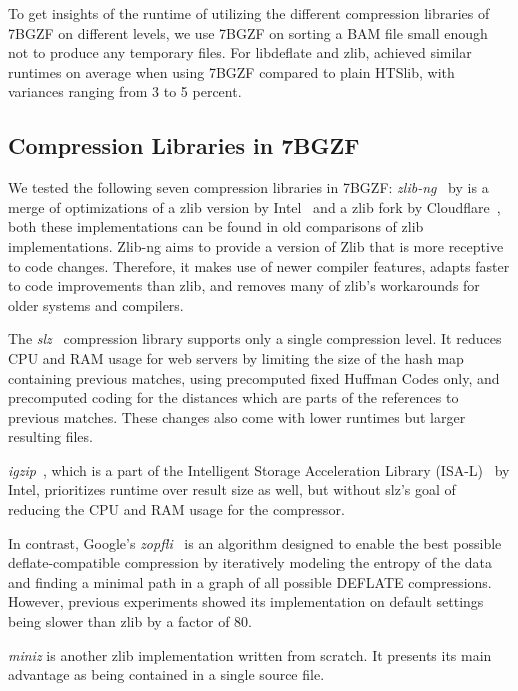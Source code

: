 To get insights of the runtime of \sort utilizing the different compression libraries of 7BGZF on different levels, we use 7BGZF on sorting a BAM file small enough not to produce any temporary files. For libdeflate and zlib, \sort achieved similar runtimes on average when using 7BGZF compared to plain HTSlib, with variances ranging from 3 to 5 percent. 

\subsection{Compression Libraries in 7BGZF}

We tested the following seven compression libraries in 7BGZF:
\textit{zlib-ng}~\cite{noauthor_zlib-ngzlib-ng_2024} by is a merge of optimizations of a zlib version by Intel~\cite{noauthor_intelzlib_2024} and a zlib fork by Cloudflare~\cite{noauthor_cloudflarezlib_2024}, both these implementations can be found in old comparisons of zlib implementations. Zlib-ng aims to provide a version of Zlib that is more receptive to code changes. Therefore, it makes use of newer compiler features, adapts faster to code improvements than zlib, and removes many of zlib's workarounds for older systems and compilers. 

The \textit{slz}~\cite{tarreau_wtarreaulibslz_2024} compression library supports only a single compression level. It reduces CPU and RAM usage for web servers by limiting the size of the hash map containing previous matches, using precomputed fixed Huffman Codes only, and precomputed coding for the distances which are parts of the references to previous matches. These changes also come with lower runtimes but larger resulting files. 

\textit{igzip}~\cite{tucker_isa-l_2017}, which is a part of the Intelligent Storage Acceleration Library (ISA-L)~\cite{noauthor_intelisa-l_2024} by Intel, prioritizes runtime over result size as well, but without slz's goal of reducing the CPU and RAM usage for the compressor. 

In contrast, Google's \textit{zopfli}~\cite{noauthor_googlezopfli_2024} is an algorithm designed to enable the best possible deflate-compatible compression by iteratively modeling the entropy of the data and finding a minimal path in a graph of all possible DEFLATE compressions. However, previous experiments showed its implementation on default settings being slower than zlib by a factor of 80. 

\textit{miniz} \cite{noauthor_richgel999miniz_nodate}  is another zlib implementation written from scratch. It presents its main advantage as being contained in a single source file. 

